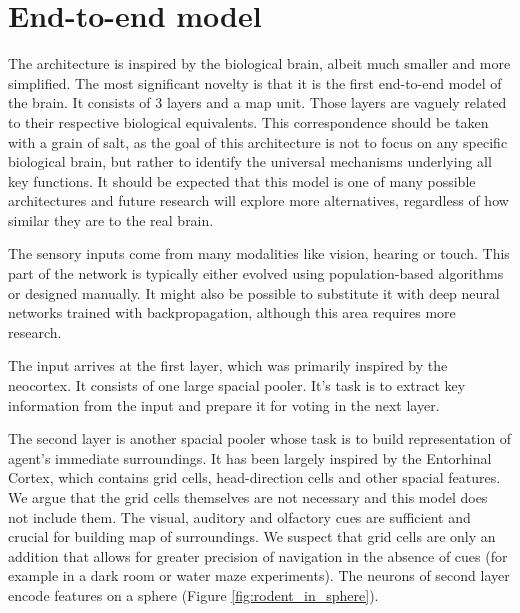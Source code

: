 \documentclass[12pt]{article}
\begin{document}
\section{End-to-end model}
The architecture is inspired by the biological brain, albeit much smaller and more simplified. The most significant novelty is that it is the first end-to-end model of the brain.  It consists of 3 layers and a map unit. Those layers are vaguely related to their respective biological equivalents.
This correspondence should be taken with a grain of salt, as the goal of this architecture is not to focus on any specific biological brain, but rather to identify the universal mechanisms underlying all key functions. It should be expected that this model is one of many possible architectures and future research will explore more alternatives, regardless of how similar they are to the real brain.
 

The sensory inputs come from many modalities like vision, hearing or touch. This part of the network is typically either evolved using population-based algorithms or designed manually. It might also be possible to substitute it with deep neural networks trained with backpropagation, although this area requires more research. 

The input arrives at the first layer, which was primarily inspired by the neocortex. It consists of one large spacial pooler. It's task is to extract key information from the input and prepare it for voting in the next layer.

The second layer is another spacial pooler whose task is to build representation of agent's immediate surroundings. It has been largely inspired by the Entorhinal Cortex, which contains grid cells, head-direction cells and other spacial features. We argue that the grid cells themselves are not necessary and this model does not include them. The visual, auditory and olfactory cues are sufficient and crucial for building map of surroundings. We suspect that grid cells are only an addition that allows for greater precision of navigation in the absence of cues (for example in a dark room or water maze experiments). The neurons of second layer encode features on a sphere (Figure \ref{fig:rodent_in_sphere}). 
\end{document}
